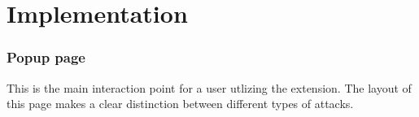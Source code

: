 \chapter{Implementation}


\subsection{Popup page}

This is the main interaction point for a user utlizing the extension. The layout of this page makes a clear distinction between different types of attacks. 